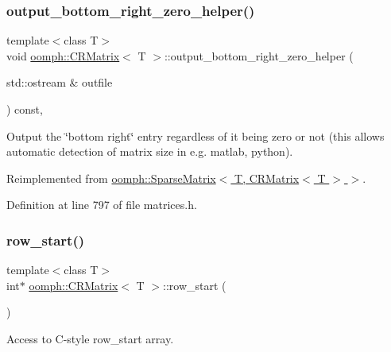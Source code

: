 \subsubsection{\texorpdfstring{output\+\_\+bottom\+\_\+right\+\_\+zero\+\_\+helper()}{output\_bottom\_right\_zero\_helper()}}
{\footnotesize\ttfamily template$<$class T$>$ \\
void \hyperlink{classoomph_1_1CRMatrix}{oomph\+::\+C\+R\+Matrix}$<$ T $>$\+::output\+\_\+bottom\+\_\+right\+\_\+zero\+\_\+helper (\begin{DoxyParamCaption}\item[{std\+::ostream \&}]{outfile }\end{DoxyParamCaption}) const\hspace{0.3cm}{\ttfamily [inline]}, {\ttfamily [virtual]}}



Output the \char`\"{}bottom right\char`\"{} entry regardless of it being zero or not (this allows automatic detection of matrix size in e.\+g. matlab, python). 



Reimplemented from \hyperlink{classoomph_1_1SparseMatrix_a4c638f36db786e159565e1f890402ed2}{oomph\+::\+Sparse\+Matrix$<$ T, C\+R\+Matrix$<$ T $>$ $>$}.



Definition at line 797 of file matrices.\+h.

\mbox{\label{classoomph_1_1CRMatrix_a6210ebb3d384de9c3a289f5d841a0d7a}} 
\subsubsection{\texorpdfstring{row\+\_\+start()}{row\_start()}\hspace{0.1cm}{\footnotesize\ttfamily [1/2]}}
{\footnotesize\ttfamily template$<$class T$>$ \\
int$\ast$ \hyperlink{classoomph_1_1CRMatrix}{oomph\+::\+C\+R\+Matrix}$<$ T $>$\+::row\+\_\+start (\begin{DoxyParamCaption}{ }\end{DoxyParamCaption})\hspace{0.3cm}{\ttfamily [inline]}}



Access to C-\/style row\+\_\+start array. 



